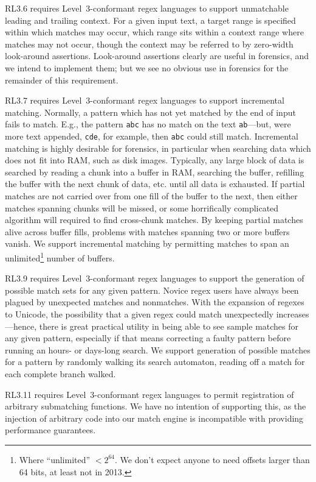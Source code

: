 \documentclass[5p,final,number,sort&compress]{elsarticle}
\newcommand{\re}[1]{\texttt{#1}}
\begin{document}
RL3.6 requires Level~3-conformant regex languages to support unmatchable leading and trailing context. For a given input text, a target range is specified within which matches may occur, which range sits within a context range where matches may not occur, though the context may be referred to by zero-width look-around assertions. Look-around assertions clearly are useful in forensics, and we intend to implement them; but we see no obvious use in forensics for the remainder of this requirement.

RL3.7 requires Level~3-conformant regex languages to support incremental matching. Normally, a pattern which has not yet matched by the end of input fails to match. E.g., the pattern \re{abc} has no match on the text \texttt{ab}---but, were more text appended, \texttt{cde}, for example, then \re{abc} could still match. Incremental matching is highly desirable for forensics, in particular when searching data which does not fit into RAM, such as disk images. Typically, any large block of data is searched by reading a chunk into a buffer in RAM, searching the buffer, refilling the buffer with the next chunk of data, etc. until all data is exhausted. If partial matches are not carried over from one fill of the buffer to the next, then either matches spanning chunks will be missed, or some horrifically complicated algorithm will required to find cross-chunk matches. By keeping partial matches alive across buffer fills, problems with matches spanning two or more buffers vanish. We support incremental matching by permitting matches to span an unlimited\footnote{Where ``unlimited'' $< 2^{64}$. We don't expect anyone to need offsets larger than 64 bits, at least not in 2013.} number of buffers.

RL3.9 requires Level~3-conformant regex languages to support the generation of possible match sets for any given pattern. Novice regex users have always been plagued by unexpected matches and nonmatches. With the expansion of regexes to Unicode, the possibility that a given regex could match unexpectedly increases---hence, there is great practical utility in being able to see sample matches for any given pattern, especially if that means correcting a faulty pattern before running an hours- or days-long search. We support generation of possible matches for a pattern by randomly walking its search automaton, reading off a match for each complete branch walked.

RL3.11 requires Level~3-conformant regex languages to permit registration of arbitrary submatching functions. We have no intention of supporting this, as the injection of arbitrary code into our match engine is incompatible with providing performance guarantees.
\end{document}
